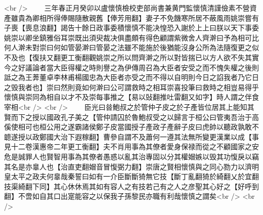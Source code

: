 <br />
　　三年春正月癸卯以盧懷慎檢校吏部尚書兼黄門監懷慎清謹儉素不營資產雖貴為卿相所得俸賜隨散親舊【俸芳用翻】妻子不免饑寒所居不蔽風雨姚崇嘗有子喪【喪息浪翻】謁告十餘日政事委積懷慎不能决惶恐入謝於上上曰朕以天下事委姚崇以卿坐鎮雅俗耳崇既出須臾裁决俱盡頗有得色顧謂紫微舍人齊澣曰予為相可比何人澣未對崇曰何如管晏澣曰管晏之法雖不能施於後猶能沒身公所為法隨復更之似不及也【復扶又翻更工衡翻觀姚崇之所以問齊澣之所以對皆揣已以方人欲不失其實今之好議論者當大臣得權之時則譽之為伊傳周召為大臣者安受之而不愧失權之後則詆之為王莾董卓李林甫楊國忠為大臣者亦受之而不得以自明則今日之諂我者乃它日之毁我者也】崇曰然則竟如何澣曰公可謂救時之相耳崇喜投筆曰救時之相豈易得乎懷慎與崇同為相自以才不及崇每事推之【易以䜴翻推吐雷翻又如字】時人謂之伴食宰相<br />
<br />
　　臣光曰㫺鮑叔之於管仲子皮之於子產皆位居其上能知其賢而下之授以國政孔子美之【管仲請囚於魯鮑叔受之以歸言于桓公曰管夷吾治于高傒使相可也桓公用之遂霸諸侯鄭子皮當國授子產政子產辭子皮曰虎帥以聽政孰敢不聼遂授以政鄭國大治下遐稼翻】曹參自謂不及蕭何一遵其法無所變更漢業以成【事見十二卷漢惠帝二年更工衡翻】夫不肖用事為其僚者愛身保禄而從之不顧國家之安危是誠罪人也賢智用事為其僚者愚惑以亂其治專固以分其權媢嫉以毁其功愎戾以竊其名是亦辠人也【治直吏翻媢音冒愎弼力翻】崇唐之賢相懷慎與之同心勠力以濟明皇太平之政夫何辠哉秦誓曰如有一介臣斷斷猗無它技【斷丁亂翻猗於綺翻乂於宜翻技渠綺翻下同】其心休休焉其如有容人之有技若己有之人之彦聖其心好之【好呼到翻】不啻如自其口出寔能容之以保我子孫黎民亦職有利哉懷慎之謂矣<br />
<br />
